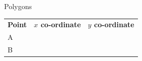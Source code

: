 \begin{exercises}{Polygons}
\begin{figure}[H]
\begin{center}
      \vspace{2pt}
    \vspace{.1in}
    
    \end{center}

 \end{figure}   

    \addtocounter{footnote}{-0}
    
        \par 
        
    
          \begin{table}[H]
        
    
        \begin{center}
      
      \label{m39358*id70156}
      
    \noindent
      \tablelasttail{}
      \begin{xtabular}[t]{|l|l|l|}\hline
    
    
        
                  \textbf{Point}
                 &
    
    
        
                  \textbf{$x$ co-ordinate}
                 &
    
    
        
                  \textbf{$y$ co-ordinate}
     \tabularnewline{}
    
    
        A &
    
    
         &
    
    
     \tabularnewline{}
    
    
        B &
    
    
         &
    
    
     \tabularnewline{}
    

\end{xtabular}
\end{center}
\end{table}
\end{exercises}
